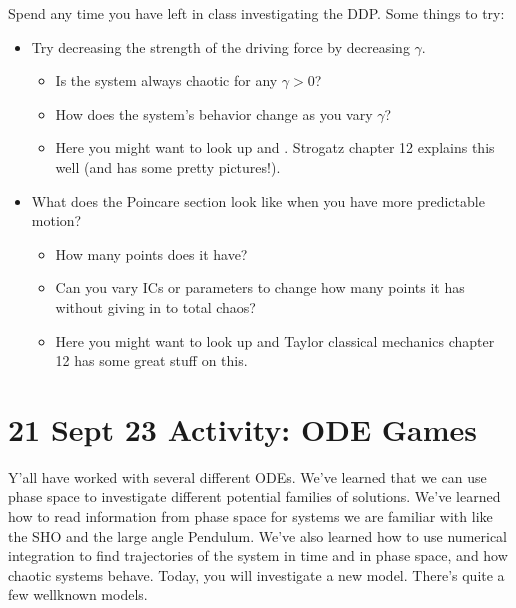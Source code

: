 \documentclass[letterpaper,10pt,english]{jupyterBook}
\begin{document}
\sphinxAtStartPar
Spend any time you have left in class investigating the DDP. Some things to try:
\begin{itemize}
\item {} 
\sphinxAtStartPar
Try decreasing the strength of the driving force by decreasing \(\gamma\).
\begin{itemize}
\item {} 
\sphinxAtStartPar
Is the system always chaotic for any \(\gamma >0\)?

\item {} 
\sphinxAtStartPar
How does the system’s behavior change as you vary \(\gamma\)?

\item {} 
\sphinxAtStartPar
Here you might want to look up  and . Strogatz chapter 12 explains this well (and has some pretty pictures!).

\end{itemize}

\item {} 
\sphinxAtStartPar
What does the Poincare section look like when you have more predictable motion?
\begin{itemize}
\item {} 
\sphinxAtStartPar
How many points does it have?

\item {} 
\sphinxAtStartPar
Can you vary ICs or parameters to change how many points it has without giving in to total chaos?

\item {} 
\sphinxAtStartPar
Here you might want to look up  and  Taylor classical mechanics chapter 12 has some great stuff on this.

\end{itemize}

\end{itemize}

\sphinxstepscope


\chapter{21 Sept 23 \sphinxhyphen{} Activity: ODE Games}
\label{\detokenize{content/1_mechanics/ODE_games:sept-23-activity-ode-games}}\label{\detokenize{content/1_mechanics/ODE_games::doc}}
\sphinxAtStartPar
Y’all have worked with several different ODEs. We’ve learned that we can use phase space to investigate different potential families of solutions. We’ve learned how to read information from phase space for systems we are familiar with like the SHO and the large angle Pendulum. We’ve also learned how to use numerical integration to find trajectories of the system in time and in phase space, and how chaotic systems behave. Today, you will investigate a new model. There’s quite a few well\sphinxhyphen{}known models.
\end{document}
